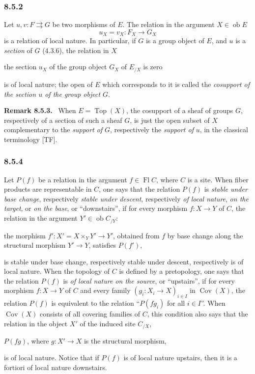 \documentclass[11pt]{article}
\newcommand{\Top}{\operatorname{Top}}
\newcommand{\Cov}{\operatorname{Cov}}
\newenvironment{remarktext}[1]{\par\medskip\noindent\textbf{#1.}\ }{\par\medskip}
\providecommand{\ob}{\operatorname{ob}}
\providecommand{\Cov}{\operatorname{Cov}}
\begin{document}
\subsubsection*{8.5.2}
Let \(u,v:F\rightrightarrows G\) be two morphisms of \(E\). The relation in the argument \(X\in\ob E\)
\[
u_X=v_X:F_X\longrightarrow G_X
\]
is a relation of local nature. In particular, if \(G\) is a group object of \(E\), and \(u\) is a \emph{section} of \(G\) (4.3.6), the relation in \(X\)
\begin{center}
the section \(u_X\) of the group object \(G_X\) of \(E_{/X}\) is zero
\end{center}
is of local nature; the open of \(E\) which corresponds to it is called the \emph{cosupport of the section \(u\) of the group object \(G\)}.

\begin{remarktext}{Remark 8.5.3}
When \(E=\Top(X)\), the cosupport of a sheaf of groups \(G\), respectively of a section of such a sheaf \(G\), is just the open subset of \(X\) complementary to the \emph{support of} \(G\), respectively the \emph{support of} \(u\), in the classical terminology [TF].
\end{remarktext}

\subsubsection*{8.5.4}
Let \(P(f)\) be a relation in the argument \(f\in\operatorname{Fl} C\), where \(C\) is a site. When fiber products are representable in \(C\), one says that the relation \(P(f)\) is \emph{stable under base change}, respectively \emph{stable under descent}, respectively \emph{of local nature}, \emph{on the target}, or \emph{on the base}, or ``downstairs'', if for every morphism \(f:X\to Y\) of \(C\), the relation in the argument \(Y'\in\ob C_{/Y}\):
\begin{center}
the morphism \(f':X'=X\times_Y Y'\to Y'\), obtained from \(f\) by base change along the structural morphism \(Y'\to Y\), satisfies \(P(f')\),
\end{center}
is stable under base change, respectively stable under descent, respectively is of local nature. When the topology of \(C\) is defined by a pretopology, one says that the relation \(P(f)\) is \emph{of local nature on the source}, or ``upstairs'', if for every morphism \(f:X\to Y\) of \(C\) and every family \((g_i:X_i\to X)_{i\in I}\) in \(\Cov(X)\), the relation \(P(f)\) is equivalent to the relation ``\(P(fg_i)\) for all \(i\in I\)''. When \(\Cov(X)\) consists of all covering families of \(C\), this condition also says that the relation in the object \(X'\) of the induced site \(C_{/X}\),
\begin{center}
\(P(fg)\), where \(g:X'\to X\) is the structural morphism,
\end{center}
is of local nature. Notice that if \(P(f)\) is of local nature upstairs, then it is a fortiori of local nature downstairs.
\end{document}
